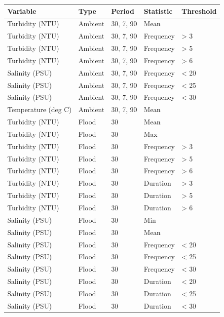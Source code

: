 \documentclass[
  letterpaper,
  DIV=11,
  numbers=noendperiod]{scrartcl}
\begin{document}
\begin{longtable}[]{@{}lllll@{}}
\toprule\noalign{}
Variable & Type & Period & Statistic & Threshold \\
\midrule\noalign{}
\endhead
\bottomrule\noalign{}
\endlastfoot
Turbidity (NTU) & Ambient & 30, 7, 90 & Mean & \\
Turbidity (NTU) & Ambient & 30, 7, 90 & Frequency & \textgreater{} 3 \\
Turbidity (NTU) & Ambient & 30, 7, 90 & Frequency & \textgreater{} 5 \\
Turbidity (NTU) & Ambient & 30, 7, 90 & Frequency & \textgreater{} 6 \\
Salinity (PSU) & Ambient & 30, 7, 90 & Frequency & \textless{} 20 \\
Salinity (PSU) & Ambient & 30, 7, 90 & Frequency & \textless{} 25 \\
Salinity (PSU) & Ambient & 30, 7, 90 & Frequency & \textless{} 30 \\
Temperature (deg C) & Ambient & 30, 7, 90 & Mean & \\
Turbidity (NTU) & Flood & 30 & Mean & \\
Turbidity (NTU) & Flood & 30 & Max & \\
Turbidity (NTU) & Flood & 30 & Frequency & \textgreater{} 3 \\
Turbidity (NTU) & Flood & 30 & Frequency & \textgreater{} 5 \\
Turbidity (NTU) & Flood & 30 & Frequency & \textgreater{} 6 \\
Turbidity (NTU) & Flood & 30 & Duration & \textgreater{} 3 \\
Turbidity (NTU) & Flood & 30 & Duration & \textgreater{} 5 \\
Turbidity (NTU) & Flood & 30 & Duration & \textgreater{} 6 \\
Salinity (PSU) & Flood & 30 & Min & \\
Salinity (PSU) & Flood & 30 & Mean & \\
Salinity (PSU) & Flood & 30 & Frequency & \textless{} 20 \\
Salinity (PSU) & Flood & 30 & Frequency & \textless{} 25 \\
Salinity (PSU) & Flood & 30 & Frequency & \textless{} 30 \\
Salinity (PSU) & Flood & 30 & Duration & \textless{} 20 \\
Salinity (PSU) & Flood & 30 & Duration & \textless{} 25 \\
Salinity (PSU) & Flood & 30 & Duration & \textless{} 30 \\

\end{longtable}
\end{document}

